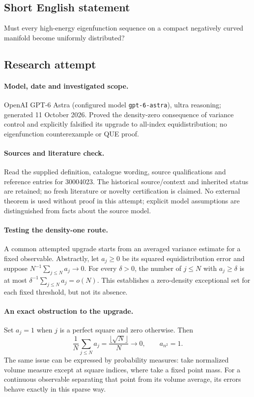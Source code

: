 \documentclass[11pt]{article}
\begin{document}
\subsection{Short English statement}
Must every high-energy eigenfunction sequence on a compact negatively curved manifold become uniformly distributed?
\subsection{Research attempt}
\paragraph{Model, date and investigated scope.}
OpenAI GPT-6 Astra (configured model \texttt{gpt-6-astra}), ultra reasoning; generated 11 October 2026. Proved the density-zero consequence of variance control and explicitly falsified its upgrade to all-index equidistribution; no eigenfunction counterexample or QUE proof.

\paragraph{Sources and literature check.}
Read the supplied definition, catalogue wording, source qualifications and reference entries for 30004023. The historical source/context and inherited status are retained; no fresh literature or novelty certification is claimed. No external theorem is used without proof in this attempt; explicit model assumptions are distinguished from facts about the source model.

\paragraph{Testing the density-one route.} A common attempted upgrade starts from an averaged variance estimate for a fixed observable. Abstractly, let \(a_j\ge0\) be its squared equidistribution error and suppose \(N^{-1}\sum_{j\le N}a_j\to0\). For every \(\delta>0\), the number of \(j\le N\) with \(a_j\ge\delta\) is at most \(\delta^{-1}\sum_{j\le N}a_j=o(N)\). This establishes a zero-density exceptional set for each fixed threshold, but not its absence.
\paragraph{An exact obstruction to the upgrade.} Set \(a_j=1\) when \(j\) is a perfect square and zero otherwise. Then
\[
 \frac1N\sum_{j\le N}a_j=\frac{\lfloor\sqrt N\rfloor}{N}\longrightarrow0,
 \qquad a_{n^2}=1.
\]
The same issue can be expressed by probability measures: take normalized volume measure except at square indices, where take a fixed point mass. For a continuous observable separating that point from its volume average, its errors behave exactly in this sparse way.
\end{document}
